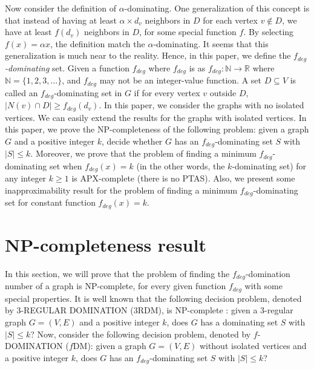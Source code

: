 \documentclass[a0,portrait]{a0poster}
\theoremstyle{definition}
\theoremstyle{plain}
\theoremstyle{definition}
\begin{document}
\begin{multicols}{2}
Now consider the definition of $\alpha$-dominating. One generalization of this concept is that instead of having at least $\alpha\times d_v$ neighbors in $D$ for each vertex $v\not \in D$, we have at least $f(d_v)$  neighbors in $D$, for some special function $f$. By selecting $f(x)=\alpha x$, the definition match the  $\alpha$-dominating.   It seems that this generalization is much near to the reality. Hence,   in this paper, we define the  {\it $f_{deg}$-dominating} set. Given a function $f_{deg}$ where $f_{deg}$ {is   as $f_{deg}:\mathbb{N}\rightarrow \mathbb{R}$} where $\mathbb{N}=\{1, 2, 3, \ldots\}$, and $f_{deg}$ may not be {an} integer-value function.  A set $D\subseteq V$ is called an  {$f_{deg}$-dominating} set in $G$ if for every vertex $v$ outside $D$, $|N(v)\cap D|\geq f_{deg}(d_v)$. In this paper, we consider the graphs with   no isolated vertices. We can easily extend the results for the graphs with isolated vertices. In this paper,  {we prove the NP-completeness of the following problem: given a graph $G$ and a positive integer $k$, decide whether $G$ has {an} $f_{deg}$-dominating set  $S$ with $|S|\leq k$.} Moreover,  we prove that the problem of finding a minimum  $f_{deg}$-dominating set when $f_{deg}(x)=k$ (in the other words, the $k$-dominating set) for any integer $k\geq 1$ is APX-complete (there is no PTAS).  Also, we present some inapproximability result for the problem of finding a minimum  $f_{deg}$-dominating set for constant function $f_{deg}(x)=k$. 
\section{NP-completeness  result}
In this section,  we will  prove that the problem of finding {the} $f_{deg}$-domination number of a graph is NP-complete, for every given function $f_{deg}$ with some special properties.  It is well known that the following decision problem, denoted by 3-REGULAR DOMINATION (3RDM), is NP-complete \cite{garey2002computers}: given a 3-regular graph $G =(V, E)$ {and} a positive integer $k$, does  $G$ has a dominating set $S$ with $|S|\leq k$?  Now,  consider the following decision problem, denoted by  $f$-DOMINATION ($f$DM): given a graph $G =(V, E)$ without isolated vertices {and a} positive integer $k$, does $G$ has an $f_{deg}$-dominating set $S$ with $|S|\leq k$?


\end{multicols}
\end{document}
